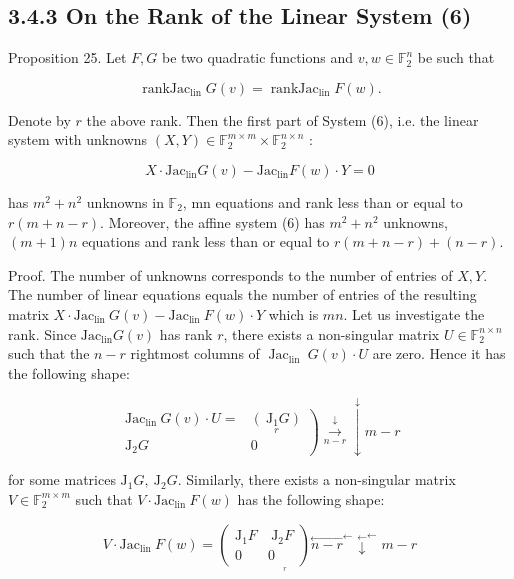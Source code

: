 \documentclass[10pt]{article}
\begin{document}
\subsection*{3.4.3 On the Rank of the Linear System (6)}
Proposition 25. Let $F, G$ be two quadratic functions and $v, w \in \mathbb{F}_{2}^{n}$ be such that

$$
\operatorname{rankJac}_{\operatorname{lin}} G(v)=\operatorname{rankJac}_{\operatorname{lin}} F(w) .
$$

Denote by $r$ the above rank. Then the first part of System (6), i.e. the linear system with unknowns $(X, Y) \in \mathbb{F}_{2}^{m \times m} \times \mathbb{F}_{2}^{n \times n}$ :


\begin{equation*}
X \cdot \mathrm{Jac}_{\operatorname{lin}} G(v)-\mathrm{Jac}_{\operatorname{lin}} F(w) \cdot Y=0 \tag{8}
\end{equation*}


has $m^{2}+n^{2}$ unknowns in $\mathbb{F}_{2}$, mn equations and rank less than or equal to $r(m+n-r)$. Moreover, the affine system (6) has $m^{2}+n^{2}$ unknowns, $(m+1) n$ equations and rank less than or equal to $r(m+n-r)+(n-r)$.

Proof. The number of unknowns corresponds to the number of entries of $X, Y$. The number of linear equations equals the number of entries of the resulting matrix $X \cdot \mathrm{Jac}_{\text {lin }} G(v)-\mathrm{Jac}_{\text {lin }} F(w) \cdot Y$ which is $m n$. Let us investigate the rank. Since $\mathrm{Jac}_{\mathrm{lin}} G(v)$ has rank $r$, there exists a non-singular matrix $U \in \mathbb{F}_{2}^{n \times n}$ such that the $n-r$ rightmost columns of $\operatorname{Jac}_{\text {lin }} G(v) \cdot U$ are zero. Hence it has the following shape:

$$
\left.\begin{array}{rl}
\mathrm{Jac}_{\text {lin }} G(v) \cdot U= & \underset{r}{\left(\mathrm{~J}_{1} G\right)} \\
\mathrm{J}_{2} G & 0
\end{array}\right) \stackrel{\downarrow}{\underset{n-r}{\longrightarrow}} \stackrel{\downarrow}{\downarrow} m-r
$$

for some matrices $\mathrm{J}_{1} G, \mathrm{~J}_{2} G$. Similarly, there exists a non-singular matrix $V \in \mathbb{F}_{2}^{m \times m}$ such that $V \cdot \mathrm{Jac}_{\text {lin }} F(w)$ has the following shape:

$$
V \cdot \mathrm{Jac}_{\text {lin }} F(w)=\underset{{ }_{r}}{\left(\begin{array}{cc}
\mathrm{J}_{1} F & \mathrm{~J}_{2} F \\
0 & 0
\end{array}\right) \stackrel{\leftarrow}{n-r}^{\leftarrow}} \stackrel{\leftarrow}{\downarrow}^{\leftarrow} m-r
$$
\end{document}
